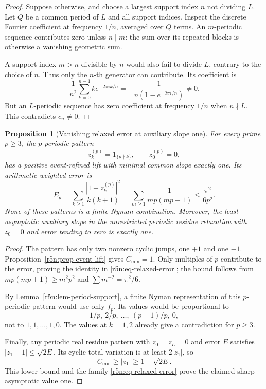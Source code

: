 \documentclass[11pt,a4paper]{article}
\newtheorem{proposition}[theorem]{Proposition}
\theoremstyle{definition}\newtheorem{definition}[theorem]{Definition}
\theoremstyle{remark}\newtheorem{remark}[theorem]{Remark}
\numberwithin{equation}{section}
\begin{document}
\begin{proof}
Suppose otherwise, and choose a largest support index \(n\)
not dividing \(L\). Let \(Q\) be a common period of \(L\) and
all support indices. Inspect the discrete Fourier coefficient
at frequency \(1/n\), averaged over \(Q\) terms.
An \(m\)-periodic sequence contributes zero unless \(n\mid m\):
the sum over its repeated blocks is otherwise a vanishing
geometric sum.

A support index \(m>n\) divisible by \(n\) would also fail to
divide \(L\), contrary to the choice of \(n\).
Thus only the \(n\)-th generator can contribute.
Its coefficient is
\[
 \frac1{n^2}\sum_{k=0}^{n-1}k e^{-2\pi i k/n}
 =-\frac1{n(1-e^{-2\pi i/n})}\ne0.
\]
But an \(L\)-periodic sequence has zero coefficient at frequency
\(1/n\) when \(n\nmid L\). This contradicts \(c_n\ne0\).
\end{proof}

\begin{proposition}[Vanishing relaxed error at auxiliary slope one]
\label{r5n:prop-relaxed-countermodel}
For every prime \(p\ge3\), the \(p\)-periodic pattern
\[
 z_k^{(p)}=1_{\{p\nmid k\}},\qquad z_0^{(p)}=0,
\]
has a positive event-refined lift with minimal common slope
exactly one. Its arithmetic weighted error is
\begin{equation}
\label{r5n:eq-relaxed-error}
 E_p=\sum_{k\ge1}
       \frac{|1-z_k^{(p)}|^2}{k(k+1)}
     =\sum_{m\ge1}\frac1{mp(mp+1)}
     \le\frac{\pi^2}{6p^2}.
\end{equation}
None of these patterns is a finite Nyman combination.
Moreover, the least asymptotic auxiliary slope in the unrestricted
periodic residue relaxation with \(z_0=0\) and error tending to
zero is exactly one.
\end{proposition}

\begin{proof}
The pattern has only two nonzero cyclic jumps, one \(+1\) and one
\(-1\). Proposition~\ref{r5n:prop-event-lift} gives \(C_{\min}=1\).
Only multiples of \(p\) contribute to the error, proving the
identity in \eqref{r5n:eq-relaxed-error}; the bound follows from
\(mp(mp+1)\ge m^2p^2\) and \(\sum m^{-2}=\pi^2/6\).

By Lemma~\ref{r5n:lem-period-support}, a finite Nyman representation
of this \(p\)-periodic pattern would use only \(f_p\).
Its values would be proportional to
\[
 1/p,\ 2/p,\ \ldots,\ (p-1)/p,\ 0,
\]
not to \(1,1,\ldots,1,0\).
The values at \(k=1,2\) already give a contradiction for \(p\ge3\).

Finally, any periodic real residue pattern with \(z_0=z_L=0\)
and error \(E\) satisfies \(|z_1-1|\le\sqrt{2E}\).
Its cyclic total variation is at least \(2|z_1|\), so
\begin{equation}
\label{r5n:eq-relaxed-slope-lower}
 C_{\min}\ge|z_1|\ge1-\sqrt{2E}.
\end{equation}
This lower bound and the family \eqref{r5n:eq-relaxed-error}
prove the claimed sharp asymptotic value one.
\end{proof}
\end{document}
